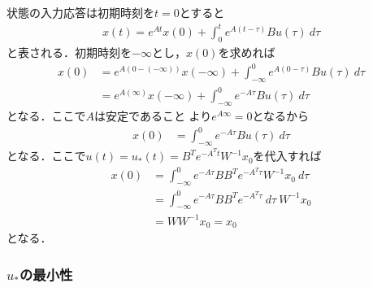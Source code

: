 状態の入力応答は初期時刻を$t=0$とすると
\begin{align}
	x(t)= e^{At}x(0) + \int_{0}^{t} e^{A(t-\tau)}Bu(\tau) \ d \tau
\end{align}
と表される．初期時刻を$-\infty$とし，$x(0)$を求めれば
\begin{align}
	x(0) &= e^{A(0-(-\infty))}x(-\infty) + \int_{-\infty}^{0} e^{A(0-\tau)}Bu(\tau) \ d \tau
\nonumber \\
	&= e^{A(\infty)}x(-\infty) + \int_{-\infty}^{0} e^{-A\tau}Bu(\tau) \ d \tau
\end{align}
となる．ここで$A$は安定であること
より$e^{A\infty}=0$となるから
\begin{align}
	x(0) 
	&= \int_{-\infty}^{0} e^{-A\tau}Bu(\tau) \ d \tau
\end{align}
となる．ここで$u(t)=u_*(t) = B^T e^{-A^T t} W^{-1} x_0$を代入すれば
\begin{align}
	x(0) 
	&= \int_{-\infty}^{0} e^{-A\tau}B B^T e^{-A^T \tau} W^{-1} x_0 \ d \tau
\nonumber \\
	&= \int_{-\infty}^{0} e^{-A\tau}B B^T e^{-A^T \tau} \ d \tau \ W^{-1} x_0 \nonumber \\
	&= W W^{-1} x_0 = x_0
\end{align}
となる．

\subsubsection{$u_*$の最小性}

